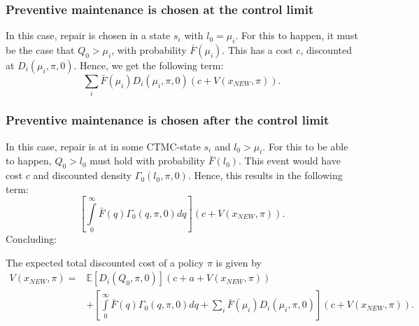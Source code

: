 \subsubsection{Preventive maintenance is chosen at the control limit}
In this case, repair is chosen in a state $s_i$ with $l_0=\mu_i$.
For this to happen, it must be the case that $Q_0>\mu_i$, with probability $\bar{F}(\mu_i)$.
This has a cost $c$, discounted at $D_{i}(\mu_i,\pi,0)$.
Hence, we get the following term:
\[
\sum\limits_i\bar{F}(\mu_i)D_{i}(\mu_i,\pi,0)(c+V(x_{NEW},\pi)).
\]

\subsubsection{Preventive maintenance is chosen after the control limit}
In this case, repair is at in some CTMC-state $s_i$ and $l_0>\mu_i$.
For this to be able to happen, $Q_0>l_0$ must hold with probability $\bar{F}(l_0)$.
This event would have cost $c$ and discounted density $\Gamma_0(l_0,\pi,0)$.
Hence, this results in the following term:
\[
\left[\int\limits_0^\infty \bar{F}(q)\Gamma_0(q,\pi,0)dq\right](c+V(x_{NEW},\pi)).
\]
Concluding:
\begin{theorem}
	The expected total discounted cost of a policy $\pi$ is given by
	\begin{equation}\label{eq:MmfmTDC}
	\begin{split}
	V(x_{NEW},\pi)=&\mathbb{E}[D_{i}(Q_0,\pi,0)](c+a+V(x_{NEW},\pi))\\
	&+\left[\int\limits_0^\infty \bar{F}(q)\Gamma_0(q,\pi,0)dq+\sum\limits_i\bar{F}(\mu_i)D_{i}(\mu_i,\pi,0)\right](c+V(x_{NEW},\pi)).
	\end{split}
	\end{equation}
\end{theorem}